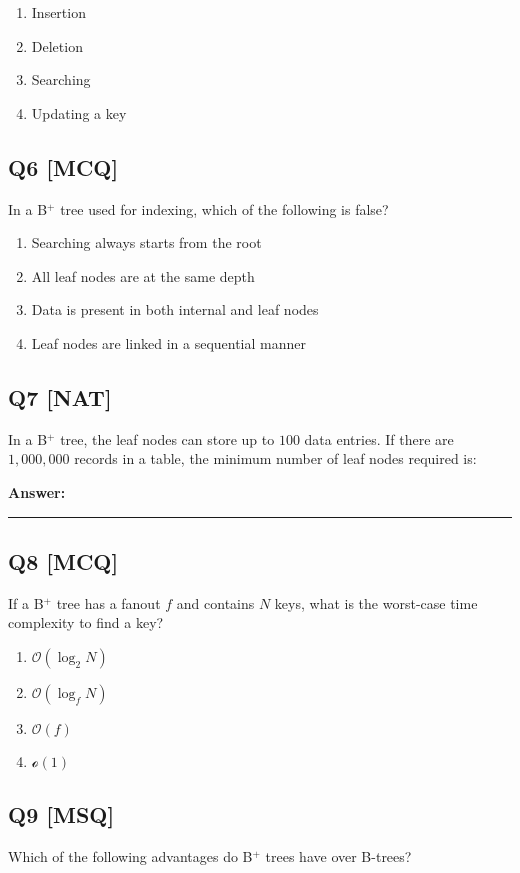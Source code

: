 \begin{enumerate}[label=(\alph*)]
    \item Insertion  
    \item Deletion  
    \item Searching  
    \item Updating a key
\end{enumerate}  


\subsection*{Q6 [MCQ]}
In a B$^+$ tree used for indexing, which of the following is false?

\begin{enumerate}[label=(\alph*)]
    \item Searching always starts from the root
    \item All leaf nodes are at the same depth
    \item Data is present in both internal and leaf nodes
    \item Leaf nodes are linked in a sequential manner
\end{enumerate}

\subsection*{Q7 [NAT]}
In a B$^+$ tree, the leaf nodes can store up to $100$ data entries. If there are $1,000,000$ records in a table, the minimum number of leaf nodes required is:

\textbf{Answer:} \rule{3cm}{0.15mm}

\subsection*{Q8 [MCQ]}
If a B$^+$ tree has a fanout $f$ and contains $N$ keys, what is the worst-case time complexity to find a key?

\begin{enumerate}[label=(\alph*)]
    \item $\mathcal{O}(\log_2 N)$ 
    \item $\mathcal{O}(\log_f N)$ 
    \item $\mathcal{O}(f)$ 
    \item $\mathcal{o}(1)$
\end{enumerate}

\subsection*{Q9 [MSQ]}
Which of the following advantages do B$^+$ trees have over B-trees?

